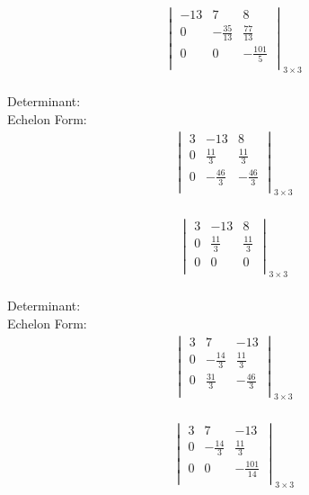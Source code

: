\documentclass{article}
\begin{document}
\\
\begin{align*}
\begin{vmatrix}
-13 & 7 & 8\\
0 & -\frac{35}{13} & \frac{77}{13}\\
0 & 0 & -\frac{101}{5}\\
\end{vmatrix}_{3\times 3}
\end{align*}
\\
Determinant:\\
Echelon Form:\\
\begin{align*}
\begin{vmatrix}
3 & -13 & 8\\
0 & \frac{11}{3} & \frac{11}{3}\\
0 & -\frac{46}{3} & -\frac{46}{3}\\
\end{vmatrix}_{3\times 3}
\end{align*}
\\
\begin{align*}
\begin{vmatrix}
3 & -13 & 8\\
0 & \frac{11}{3} & \frac{11}{3}\\
0 & 0 & 0\\
\end{vmatrix}_{3\times 3}
\end{align*}
\\
Determinant:\\
Echelon Form:\\
\begin{align*}
\begin{vmatrix}
3 & 7 & -13\\
0 & -\frac{14}{3} & \frac{11}{3}\\
0 & \frac{31}{3} & -\frac{46}{3}\\
\end{vmatrix}_{3\times 3}
\end{align*}
\\
\begin{align*}
\begin{vmatrix}
3 & 7 & -13\\
0 & -\frac{14}{3} & \frac{11}{3}\\
0 & 0 & -\frac{101}{14}\\
\end{vmatrix}_{3\times 3}
\end{align*}
\\
\end{document}
